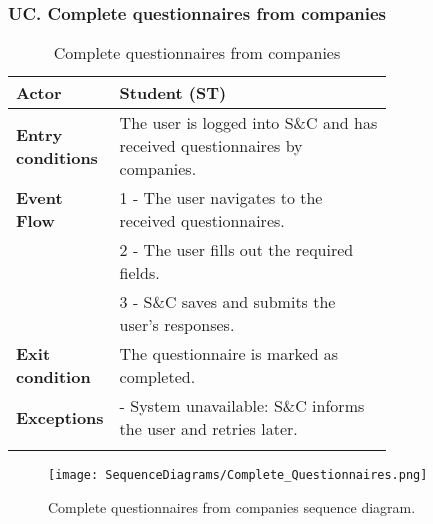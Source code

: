 \subsubsection*{UC\cuc . Complete questionnaires from companies}
\begin{center}
    \begin{longtable}{|l|p{0.75\linewidth}|}
        \hline
        \textbf{Actor}            & Student (ST) \\
        \hline
        \textbf{Entry conditions} & The user is logged into S\&C and has received questionnaires by companies. \\
        \hline
        \textbf{Event Flow}       & 1 - The user navigates to the received questionnaires. \\
        & 2 - The user fills out the required fields. \\
        & 3 - S\&C saves and submits the user's responses. \\
        \hline
        \textbf{Exit condition}   & The questionnaire is marked as completed. \\       
        \hline
        \textbf{Exceptions}       & - System unavailable: S\&C informs the user and retries later. \\
        \hline
        \caption{Complete questionnaires from companies}
        \label{tab:complete_questionnaires_usecase}
    \end{longtable}
\end{center}

\begin{figure}[H]
    \begin{center}
        \texttt{[image: SequenceDiagrams/Complete\_Questionnaires.png]}
        \caption{Complete questionnaires from companies sequence diagram.}
        \label{fig:complete_questionnaires_seqd}%
    \end{center}
\end{figure}



